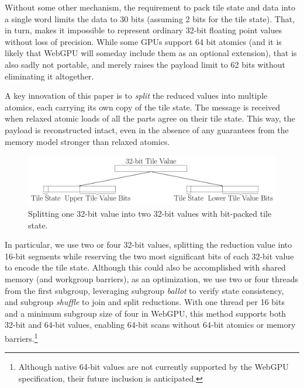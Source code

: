 \documentclass[acmsmall, manuscript, screen, review, anonymous]{acmart}
\begin{document}
Without some other mechanism, the requirement to pack tile state and data into a single word limits the data to 30 bits (assuming 2 bits for the tile state). That, in turn, makes it impossible to represent ordinary 32-bit floating point values without loss of precision. While some GPUs support 64 bit atomics (and it is likely that WebGPU will someday include them as an optional extension), that is also sadly not portable, and merely raises the payload limit to 62 bits without eliminating it altogether.

A key innovation of this paper is to \emph{split} the reduced values into multiple atomics, each carrying its own copy of the tile state. The message is received when relaxed atomic loads of all the parts agree on their tile state. This way, the payload is reconstructed intact, even in the absence of any guarantees from the memory model stronger than relaxed atomics.

\begin{figure}[h!]
  \centering
  \includegraphics[width=.7\linewidth]{graphics/split.pdf}
  \caption{Splitting one 32-bit value into two 32-bit values with bit-packed tile state.}
\end{figure}

In particular, we use two or four 32-bit values, splitting the reduction value into 16-bit segments while reserving the two most significant bits of each 32-bit value to encode the tile state. Although this could also be accomplished with shared memory (and workgroup barriers), as an optimization, we use two or four threads from the first subgroup, leveraging subgroup \emph{ballot} to verify state consistency, and subgroup \emph{shuffle} to join and split reductions. With one thread per 16 bits and a minimum subgroup size of four in WebGPU, this method supports both 32-bit and 64-bit values, enabling 64-bit scans without 64-bit atomics or memory barriers.\footnote{Although native 64-bit values are not currently supported by the WebGPU specification, their future inclusion is anticipated.}
\end{document}
